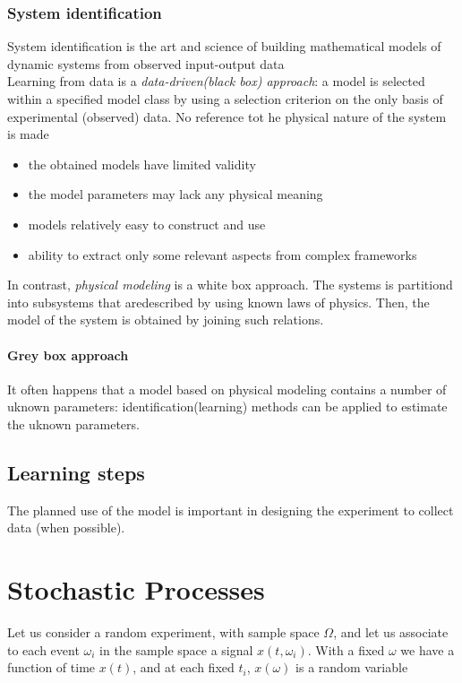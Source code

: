 \documentclass{book}
\begin{document}
\subsection{System identification}
System identification is the art and science of building mathematical models of dynamic systems from observed input-output data\\
Learning from data is a \emph{data-driven(black box) approach}: a model is selected within a specified model class by using a selection criterion on the only basis of experimental (observed) data. No reference tot he physical nature of the system is made
\begin{itemize}
    \item the obtained models have limited validity
    \item the model parameters may lack any physical meaning
    \item models relatively easy to construct and use
    \item ability to extract only some relevant aspects from complex frameworks
\end{itemize}

In contrast, \emph{physical modeling} is a white box approach. The systems is partitiond into subsystems that aredescribed by using known laws of physics. Then, the model of the system is obtained by joining such relations.

\subsubsection{Grey box approach}
It often happens that a model based on physical modeling contains a number of uknown parameters: identification(learning) methods can be applied to estimate the uknown parameters.

\section{Learning steps}
The planned use of the model is important in designing the experiment to collect data (when possible).





\chapter{Stochastic Processes}

Let us consider a random experiment, with sample space $\Omega$, and let us associate to each event $\omega_i$ in the sample space a signal $x(t,\omega_i)$. With a fixed $\omega$ we have a function of time $x(t)$, and at each fixed $t_i$, $x(\omega)$ is a random variable
\end{document}
